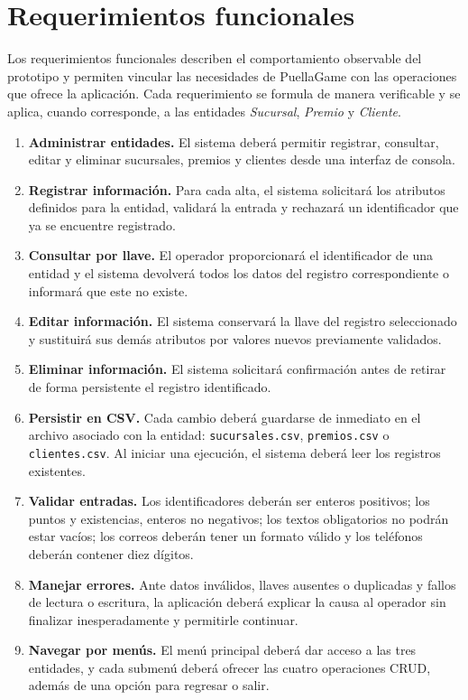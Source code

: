 \section{Requerimientos funcionales}

Los requerimientos funcionales describen el comportamiento observable del
prototipo y permiten vincular las necesidades de PuellaGame con las operaciones
que ofrece la aplicación. Cada requerimiento se formula de manera verificable y
se aplica, cuando corresponde, a las entidades \emph{Sucursal}, \emph{Premio} y
\emph{Cliente}.

\begin{enumerate}[label=\textbf{RF-\arabic*.}, leftmargin=*]
    \item \textbf{Administrar entidades.} El sistema deberá permitir registrar,
    consultar, editar y eliminar sucursales, premios y clientes desde una
    interfaz de consola.
    \item \textbf{Registrar información.} Para cada alta, el sistema solicitará
    los atributos definidos para la entidad, validará la entrada y rechazará un
    identificador que ya se encuentre registrado.
    \item \textbf{Consultar por llave.} El operador proporcionará el
    identificador de una entidad y el sistema devolverá todos los datos del
    registro correspondiente o informará que este no existe.
    \item \textbf{Editar información.} El sistema conservará la llave del
    registro seleccionado y sustituirá sus demás atributos por valores nuevos
    previamente validados.
    \item \textbf{Eliminar información.} El sistema solicitará confirmación
    antes de retirar de forma persistente el registro identificado.
    \item \textbf{Persistir en CSV.} Cada cambio deberá guardarse de inmediato
    en el archivo asociado con la entidad: \texttt{sucursales.csv},
    \texttt{premios.csv} o \texttt{clientes.csv}. Al iniciar una ejecución, el
    sistema deberá leer los registros existentes.
    \item \textbf{Validar entradas.} Los identificadores deberán ser enteros
    positivos; los puntos y existencias, enteros no negativos; los textos
    obligatorios no podrán estar vacíos; los correos deberán tener un formato
    válido y los teléfonos deberán contener diez dígitos.
    \item \textbf{Manejar errores.} Ante datos inválidos, llaves ausentes o
    duplicadas y fallos de lectura o escritura, la aplicación deberá explicar
    la causa al operador sin finalizar inesperadamente y permitirle continuar.
    \item \textbf{Navegar por menús.} El menú principal deberá dar acceso a las
    tres entidades, y cada submenú deberá ofrecer las cuatro operaciones CRUD,
    además de una opción para regresar o salir.
\end{enumerate}

